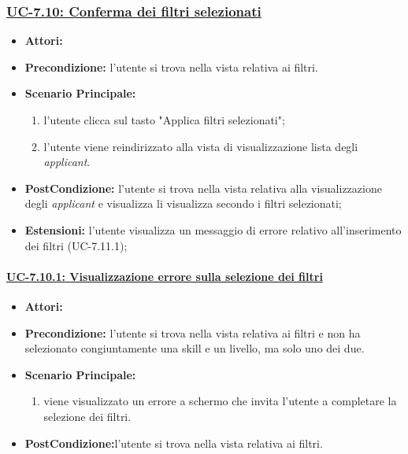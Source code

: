 \subsubsection{\underline{UC-7.10: Conferma dei filtri selezionati}}
\begin{itemize}
\item \textbf{Attori:}\loggedusr
\item \textbf{Precondizione:} l'utente si trova nella vista relativa ai filtri.
\item \textbf{Scenario Principale:}
\begin{enumerate}
	\item l'utente clicca sul tasto "Applica filtri selezionati";
	\item l'utente viene reindirizzato alla vista di visualizzazione lista degli \textit{applicant}.
\end{enumerate}
\item \textbf{PostCondizione:} l'utente si trova nella vista relativa alla visualizzazione degli \textit{applicant} e visualizza li visualizza secondo i filtri selezionati;
\item \textbf{Estensioni:} l'utente visualizza un messaggio di errore relativo all'inserimento dei filtri (UC-7.11.1);
\end{itemize}

\paragraph{\underline{UC-7.10.1: Visualizzazione errore sulla selezione dei filtri}}
\begin{itemize}
\item \textbf{Attori:}\loggedusr
\item \textbf{Precondizione:} l'utente si trova nella vista relativa ai filtri e non ha selezionato congiuntamente una skill e un livello, ma solo uno dei due.
\item \textbf{Scenario Principale:}
\begin{enumerate}
	\item viene visualizzato un errore a schermo che invita l'utente a completare la selezione dei filtri.
\end{enumerate}
\item \textbf{PostCondizione:}l'utente si trova nella vista relativa ai filtri.
\end{itemize}


